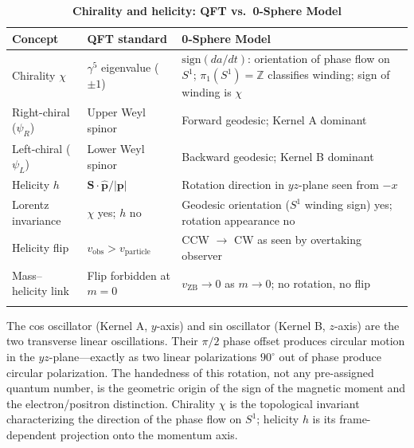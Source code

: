 \documentclass[%
 reprint, amsmath,amssymb, aps, prb, ]{revtex4-2}
\numberwithin{equation}{section}
\begin{document}
\begin{table}[ht]
\centering
\caption{\textbf{Chirality and helicity: QFT vs.\ 0-Sphere Model}}
\label{tab:chiralhelicity}
\renewcommand{\arraystretch}{1.4}
\begin{tabular}{p{4.0cm}p{5.5cm}p{6.0cm}}
\toprule
\textbf{Concept} & \textbf{QFT standard} & \textbf{0-Sphere Model} \\
\midrule
Chirality $\chi$
& $\gamma^5$ eigenvalue ($\pm1$)
& $\text{sign}(da/dt)$: orientation of phase flow on $S^1$; $\pi_1(S^1)=\mathbb{Z}$ classifies winding; sign of winding is $\chi$ \\
\addlinespace[0.3cm]
Right-chiral ($\psi_R$)
& Upper Weyl spinor
& Forward geodesic; Kernel A dominant \\
\addlinespace[0.3cm]
Left-chiral ($\psi_L$)
& Lower Weyl spinor
& Backward geodesic; Kernel B dominant \\
\addlinespace[0.3cm]
Helicity $h$
& $\mathbf{S}\cdot\hat{\mathbf{p}}/|\mathbf{p}|$
& Rotation direction in $yz$-plane seen from $-x$ \\
\addlinespace[0.3cm]
Lorentz invariance
& $\chi$ yes; $h$ no
& Geodesic orientation ($S^1$ winding sign) yes; rotation appearance no \\
\addlinespace[0.3cm]
Helicity flip
& $v_{\mathrm{obs}}>v_{\mathrm{particle}}$
& CCW $\to$ CW as seen by overtaking observer \\
\addlinespace[0.3cm]
Mass--helicity link
& Flip forbidden at $m=0$
& $v_{\mathrm{ZB}}\to 0$ as $m\to 0$; no rotation, no flip \\
\addlinespace[0.2cm]
\bottomrule
\end{tabular}
\vspace{0.2cm}
\begin{minipage}{0.95\textwidth}
\justifying\footnotesize
The cos oscillator (Kernel A, $y$-axis) and sin oscillator (Kernel B, $z$-axis) are the two transverse linear oscillations. Their $\pi/2$ phase offset produces circular motion in the $yz$-plane---exactly as two linear polarizations $90^{\circ}$ out of phase produce circular polarization. The handedness of this rotation, not any pre-assigned quantum number, is the geometric origin of the sign of the magnetic moment and the electron/positron distinction. Chirality $\chi$ is the topological invariant characterizing the direction of the phase flow on $S^1$; helicity $h$ is its frame-dependent projection onto the momentum axis.
\end{minipage}
\end{table}
\end{document}
